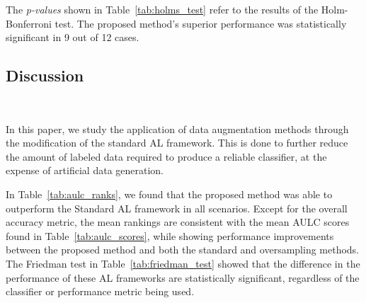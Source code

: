 \begin{table}
	\centering
    \caption[Adjusted p-values using the Wilcoxon signed-rank method.]{%
        Adjusted p-values using the Wilcoxon signed-rank method. Bold values
        are statistically significant at a level of $\alpha = 0.05$. The null
        hypothesis is that the performance of the proposed framework is
        similar to that of the oversampling or standard framework.
    }\label{tab:wilcoxon_test_al_augmentation}
\end{table}

The \textit{p-values} shown in Table~\ref{tab:holms_test} refer to the results
of the Holm-Bonferroni test. The proposed method's superior performance was
statistically significant in 9 out of 12 cases. 

\begin{table}
	\centering
    \caption[Adjusted p-values using the Holm-Bonferroni method.]{%
        Adjusted p-values using the Holm-Bonferroni method. Bold values are
        statistically significant at a level of $\alpha = 0.05$. The null
        hypothesis is that the Oversampling or Proposed method does not
        perform better than the control method (Standard AL framework).
    }\label{tab:holms_test}
\end{table}

\subsection{Discussion}~\label{sec:sub_discussion-al-aug}

In this paper, we study the application of data augmentation methods
through the modification of the standard AL framework. This is done to further
reduce the amount of labeled data required to produce a reliable classifier,
at the expense of artificial data generation.
 
In Table~\ref{tab:aulc_ranks}, we found that the proposed method was able to
outperform the Standard AL framework in all scenarios. Except for
the overall accuracy metric, the mean rankings are consistent with the mean
AULC scores found in Table~\ref{tab:aulc_scores}, while showing performance
improvements between the proposed method and both the standard and
oversampling methods. The Friedman test in Table~\ref{tab:friedman_test}
showed that the difference in the performance of these AL frameworks are
statistically significant, regardless of the classifier or performance metric
being used.
 
